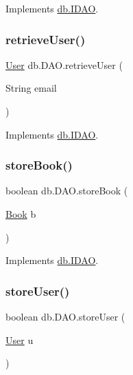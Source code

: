 Implements \hyperlink{interfacedb_1_1_i_d_a_o_a53fd20610d94f7c5f0f713dad7528c26}{db.\+I\+D\+AO}.

\mbox{\label{classdb_1_1_d_a_o_a6da084ffd9b0da23acba9dc68e747303}} 
\subsubsection{\texorpdfstring{retrieve\+User()}{retrieveUser()}}
{\footnotesize\ttfamily \hyperlink{classserver_1_1data_1_1_user}{User} db.\+D\+A\+O.\+retrieve\+User (\begin{DoxyParamCaption}\item[{String}]{email }\end{DoxyParamCaption})}



Implements \hyperlink{interfacedb_1_1_i_d_a_o_ad00bb5255d0badadbf5244799c3b708f}{db.\+I\+D\+AO}.

\mbox{\label{classdb_1_1_d_a_o_a036246b8124d7ac8a36e3eaafd3eb81a}} 
\subsubsection{\texorpdfstring{store\+Book()}{storeBook()}}
{\footnotesize\ttfamily boolean db.\+D\+A\+O.\+store\+Book (\begin{DoxyParamCaption}\item[{\hyperlink{classserver_1_1data_1_1_book}{Book}}]{b }\end{DoxyParamCaption})}



Implements \hyperlink{interfacedb_1_1_i_d_a_o_a39851dc1e1f05af40afeb76a5f8be99a}{db.\+I\+D\+AO}.

\mbox{\label{classdb_1_1_d_a_o_a1600c5d7d28eb225fc7c244fdfb16150}} 
\subsubsection{\texorpdfstring{store\+User()}{storeUser()}}
{\footnotesize\ttfamily boolean db.\+D\+A\+O.\+store\+User (\begin{DoxyParamCaption}\item[{\hyperlink{classserver_1_1data_1_1_user}{User}}]{u }\end{DoxyParamCaption})}



